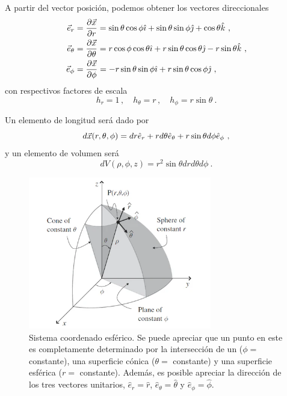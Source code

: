 A partir del vector posición, podemos obtener los vectores direccionales 
\begin{align}
    \vec{e}_r & = \frac{\partial \x}{\partial r} = \sin \theta \cos \phi \hat{\imath} + \sin \theta \sin \phi \hat{\jmath} + \cos \theta \hat{k} \ , \\
    \vec{e}_\theta & = \frac{\partial \x}{\partial \theta} = r \cos \phi \cos \theta \hat{\imath} + r \sin \theta \cos \theta \hat{\jmath} - r \sin \theta \hat{k} \ , \\
    \vec{e}_\phi & = \frac{\partial \x}{\partial \phi} = -r \sin \theta \sin \phi  \hat{\imath} + r \sin \theta \cos \phi \hat{\jmath} \ ,
\end{align}
con respectivos factores de escala 
\begin{equation}
    h_r = 1 \, , \quad h_\theta = r \, , \quad h_\phi = r \sin \theta \ .
\end{equation}

Un elemento de longitud será dado por 
\begin{equation}
    d\vec{x}(r, \theta, \phi) = dr \hat{e}_r + r d\theta \hat{e}_\theta + r \sin \theta d\phi \hat{e}_\phi \ ,
\end{equation}
y un elemento de volumen será
\begin{equation}
    dV(\rho, \phi, z) = r^2 \sin \theta dr d\theta d\phi \ .
\end{equation}

\begin{figure}[htbp]
    \centering
    \includegraphics[width=8cm]{Figuras/Lineas-coordenadas-esfericas.png}
    \caption{Sistema coordenado esférico. Se puede apreciar que un punto en este es completamente determinado por la intersección de un ($\phi = $ constante), una superficie cónica ($\theta = $ constante) y una superficie esférica ($r = $ constante). Además, es posible apreciar la dirección de los tres vectores unitarios, $\hat{e}_r = \hat{r}$, $\hat{e}_\theta = \hat{\theta}$ y $\hat{e}_\phi = \hat{\phi}$.}
\end{figure}

